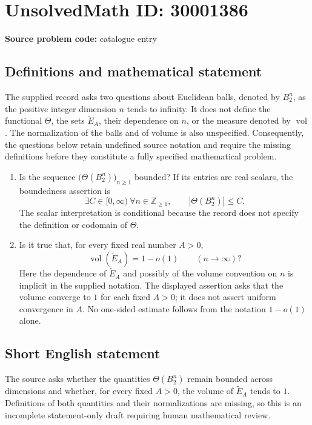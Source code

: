 \documentclass[11pt]{article}
\newcommand{\Z}{\mathbb{Z}}
\begin{document}
\section*{UnsolvedMath ID: 30001386}
\textbf{Source problem code:} catalogue entry
\subsection{Definitions and mathematical statement}
The supplied record asks two questions about Euclidean balls, denoted by \(B_2^n\), as the positive integer dimension \(n\) tends to infinity. It does not define the functional \(\Theta\), the sets \(\widetilde E_A\), their dependence on \(n\), or the measure denoted by \(\operatorname{vol}\). The normalization of the balls and of volume is also unspecified. Consequently, the questions below retain undefined source notation and require the missing definitions before they constitute a fully specified mathematical problem.

\begin{enumerate}
\item Is the sequence \(\bigl(\Theta(B_2^n)\bigr)_{n\geq 1}\) bounded? If its entries are real scalars, the boundedness assertion is
\[
\exists C\in[0,\infty)\ \forall n\in\Z_{\geq 1},\qquad |\Theta(B_2^n)|\leq C.
\]
The scalar interpretation is conditional because the record does not specify the definition or codomain of \(\Theta\).
\item Is it true that, for every fixed real number \(A>0\),
\[
\operatorname{vol}(\widetilde E_A)=1-o(1)\qquad(n\to\infty)?
\]
Here the dependence of \(\widetilde E_A\) and possibly of the volume convention on \(n\) is implicit in the supplied notation. The displayed assertion asks that the volume converge to \(1\) for each fixed \(A>0\); it does not assert uniform convergence in \(A\). No one-sided estimate follows from the notation \(1-o(1)\) alone.
\end{enumerate}
\subsection{Short English statement}
The source asks whether the quantities \(\Theta(B_2^n)\) remain bounded across dimensions and whether, for every fixed \(A>0\), the volume of \(\widetilde E_A\) tends to \(1\). Definitions of both quantities and their normalizations are missing, so this is an incomplete statement-only draft requiring human mathematical review.
\end{document}
